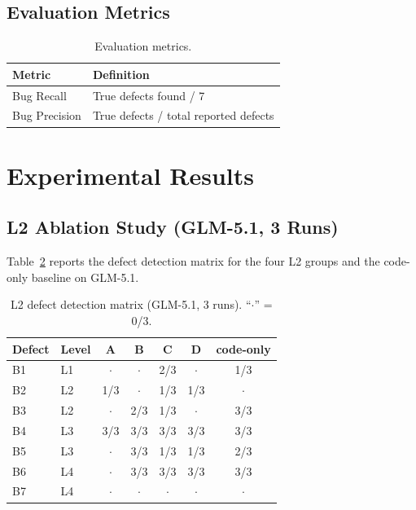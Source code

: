 \documentclass[sigconf,nonacm]{acmart}
\begin{document}
\subsection{Evaluation Metrics}

\begin{table}[t]
\caption{Evaluation metrics.}
\label{tab:metrics}
\small
\begin{tabular}{ll}
\toprule
Metric & Definition \\
\midrule
Bug Recall & True defects found / 7 \\
Bug Precision & True defects / total reported defects \\
\bottomrule
\end{tabular}
\end{table}

\clearpage
\section{Experimental Results}

\subsection{L2 Ablation Study (GLM-5.1, 3 Runs)}

Table~\ref{tab:glm-matrix} reports the defect detection matrix for the four L2 groups and the code-only baseline on GLM-5.1.

\begin{table}[t]
\caption{L2 defect detection matrix (GLM-5.1, 3 runs). ``$\cdot$'' = 0/3.}
\label{tab:glm-matrix}
\small
\begin{tabular}{llccccc}
\toprule
Defect & Level & A & B & C & D & code-only \\
\midrule
B1 & L1 & $\cdot$ & $\cdot$ & 2/3 & $\cdot$ & 1/3 \\
B2 & L2 & 1/3 & $\cdot$ & 1/3 & 1/3 & $\cdot$ \\
B3 & L2 & $\cdot$ & 2/3 & 1/3 & $\cdot$ & 3/3 \\
B4 & L3 & 3/3 & 3/3 & 3/3 & 3/3 & 3/3 \\
B5 & L3 & $\cdot$ & 3/3 & 1/3 & 1/3 & 2/3 \\
B6 & L4 & $\cdot$ & 3/3 & 3/3 & 3/3 & 3/3 \\
B7 & L4 & $\cdot$ & $\cdot$ & $\cdot$ & $\cdot$ & $\cdot$ \\
\bottomrule
\end{tabular}
\end{table}
\end{document}
